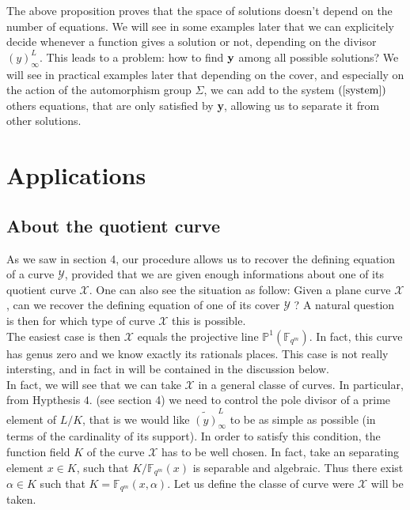 \documentclass[10pt]{article}
\newcommand{\s}{\vspace{0.3cm}}
\newcommand{\PP}{\mathbb{P}}
\newcommand{\fqm}{\mathbb{F}_{q^m}}
\newcommand{\X}{\mathcal{X}}
\newcommand{\Y}{\mathcal{Y}}
\begin{document}
\s

The above proposition proves that the space of solutions doesn't depend on the number of equations. 
We will see in some examples later that we can explicitely decide whenever a function gives a solution or not, depending on the divisor $(y)^L_{\infty}$. This leads to a problem: how to find $\bf{y}$ \rm among all possible solutions? We will see in practical examples later that depending on the cover, and especially on the action of the automorphism group $\Sigma$,  we can add to the system $(\ref{system})$ others equations, that are only satisfied by \textbf{y}, allowing us to separate it from other solutions.

\s
\section{Applications}

\s

\subsection{About the quotient curve}

\s


As we saw in section 4, our procedure allows us to recover the defining equation of a curve $\Y$, provided that we are given enough informations about one of its quotient curve $\X$. One can also see the situation as follow: Given a plane curve $\X$, can we recover the defining equation of one of its cover $\Y$ ? A natural question is then for which type of curve $\X$ this is possible. \\


The easiest case is then $\X$ equals the projective line $\PP^1(\fqm)$. In fact, this curve has genus zero and we know exactly its rationals places. This case is not really intersting, and in fact in will be contained in the discussion below.\\

In fact, we will see that we can take $\X$ in a general classe of curves. In particular, from Hypthesis $4.$ (see section 4) we need to control the pole divisor of a prime element of $L/K$, that is we would like $\widetilde{(y)}^L_{\infty}$ to be as simple as possible (in terms of the cardinality of its support). In order to satisfy this condition, the function field $K$ of the curve $\X$ has to be well chosen. In fact, take an separating element $x \in K$, such that $K/\fqm(x)$ is separable and algebraic. Thus there exist $\alpha \in K$ such that $K=\fqm(x,\alpha)$. Let us define the classe of curve were $\X$ will be taken.
\end{document}
